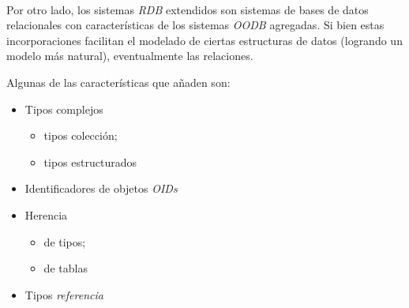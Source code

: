 ~\\

Por otro lado, los sistemas \emph{RDB} extendidos son sistemas de bases de datos relacionales con características de los sistemas \emph{OODB} agregadas. Si bien estas incorporaciones facilitan el modelado de ciertas estructuras de datos (logrando un modelo más natural), eventualmente  las relaciones.

Algunas de las características que añaden son:

\begin{itemize}
    \item Tipos complejos
        \begin{itemize}
            \item tipos colección;
            \item tipos estructurados
        \end{itemize}
    \item Identificadores de objetos \emph{OIDs} 
    \item Herencia
        \begin{itemize}
            \item de tipos;
            \item de tablas
        \end{itemize}
    \item Tipos \emph{referencia} 
\end{itemize}






\clearpage




